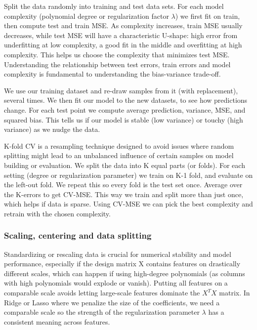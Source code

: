 \documentclass[amssymb,twocolumn,aps]{revtex4}
\begin{document}
Split the data randomly into training and test data sets. For each model complexity (polynomial degree or regularization factor $\lambda$) we first fit on train, then compute test and train MSE. As complexity increases, train MSE usually decreases, while test MSE will have a characteristic U-shape: high error from underfitting at low complexity, a good fit in the middle and overfitting at high complexity. This helps us choose the complexity that minimizes test MSE. Understanding the relationship between test errors, train errors and model complexity is fundamental to understanding the bias-variance trade-off. 


We use our training dataset and re-draw samples from it (with replacement), several times. We then fit our model to the new datasets, to see how predictions change. For each test point we compute average prediction, variance, MSE, and squared bias. This tells us if our model is stable (low variance) or touchy (high variance) as we nudge the data. 


K-fold CV is a resampling technique designed to avoid issues where random splitting might lead to an unbalanced influence of certain samples on model building or evaluation. We split the data into K equal parts (or folds). For each setting (degree or regularization parameter) we train on K-1 fold, and evaluate on the left-out fold. We repeat this so every fold is the test set once. Average over the K-errors to get CV-MSE. This way we train and split more than just once, which helps if data is sparse. Using CV-MSE we can pick the best complexity and retrain with the chosen complexity.  

\subsubsection{Scaling, centering and data splitting}

Standardizing or rescaling data is crucial for numerical stability and model performance, especially if the design matrix X contains features on drastically different scales, which can happen if using high-degree polynomials (as columns with high polynomials would explode or vanish). Putting all features on a comparable scale avoids letting large-scale features dominate the $X^TX$ matrix. In Ridge or Lasso where we penalize the size of the coefficients, we need a comparable scale so the strength of the regularization parameter $\lambda$ has a consistent meaning across features. \\
\end{document}
